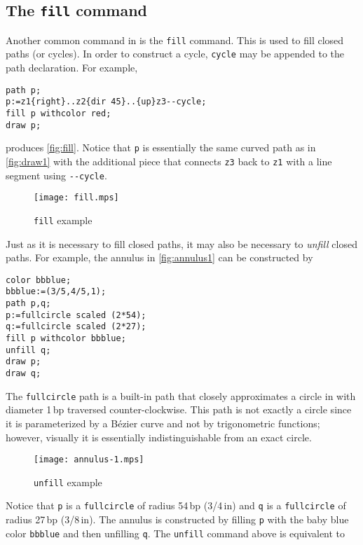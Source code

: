 \subsection{The \texttt{fill} command}

Another common command in \MP{} is the \texttt{fill} command.  This is
used to fill closed paths (or cycles).  In order to construct a cycle,
\texttt{cycle} may be appended to the path declaration.  For example,

\begin{lstlisting}[xleftmargin=7bp]
path p;
p:=z1{right}..z2{dir 45}..{up}z3--cycle;
fill p withcolor red;
draw p;
\end{lstlisting}
produces \autoref{fig:fill}.  Notice that \texttt{p} is essentially the
same curved path as in \autoref{fig:draw1} with the additional piece
that connects \texttt{z3} back to \texttt{z1} with a line segment using
\texttt{-{}-cycle}.

\begin{figure}
  \centering
  \texttt{[image: fill.mps]}
  \caption{\texttt{fill} example}
  \label{fig:fill}
\end{figure}

Just as it is necessary to fill closed paths, it may also be necessary
to \textit{unfill} closed paths.  For example, the annulus in
\autoref{fig:annulus1} can be constructed by

\begin{lstlisting}[xleftmargin=38bp]
color bbblue;
bbblue:=(3/5,4/5,1);
path p,q;
p:=fullcircle scaled (2*54);
q:=fullcircle scaled (2*27);
fill p withcolor bbblue;
unfill q;
draw p;
draw q;
\end{lstlisting}

The \texttt{fullcircle} path is a built-in path that closely
approximates a circle in \MP{} with diameter 1\,bp traversed
counter-clockwise.  This path is not exactly a circle since it is
parameterized by a B\'{e}zier curve and not by trigonometric functions;
however, visually it is essentially indistinguishable from an exact
circle.

\begin{figure}
  \centering
  \texttt{[image: annulus-1.mps]}
  \caption{\texttt{unfill} example}
  \label{fig:annulus1}
\end{figure}

Notice that \texttt{p} is a \texttt{fullcircle} of radius 54\,bp
(3/4\,in) and \texttt{q} is a \texttt{fullcircle} of radius 27\,bp
(3/8\,in).  The annulus is constructed by filling \texttt{p} with the
baby blue color \texttt{bbblue} and then unfilling \texttt{q}.  The
\texttt{unfill} command above is equivalent to

